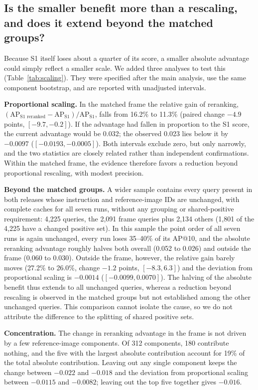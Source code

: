 \documentclass[conference]{IEEEtran}
\begin{document}
\subsection{Is the smaller benefit more than a rescaling, and does it extend beyond the matched groups?}\label{sec:res-scaling}
Because S1 itself loses about a quarter of its score, a smaller absolute advantage could simply reflect a smaller scale. We added three analyses to test this (Table~\ref{tab:scaling}). They were specified after the main analysis, use the same component bootstrap, and are reported with unadjusted intervals.

\textbf{Proportional scaling.} In the matched frame the relative gain of reranking, $(\mathrm{AP}_{\text{S1 reranked}}-\mathrm{AP}_{\text{S1}})/\mathrm{AP}_{\text{S1}}$, falls from 16.2\% to 11.3\% (paired change $-4.9$ points, $[-9.7, -0.2]$). If the advantage had fallen in proportion to the S1 score, the current advantage would be 0.032; the observed 0.023 lies below it by $-0.0097$ ($[-0.0193, -0.0005]$). Both intervals exclude zero, but only narrowly, and the two statistics are closely related rather than independent confirmations. Within the matched frame, the evidence therefore favors a reduction beyond proportional rescaling, with modest precision.

\textbf{Beyond the matched groups.} A wider sample contains every query present in both releases whose instruction and reference-image IDs are unchanged, with complete caches for all seven runs, without any grouping or shared-positive requirement: 4,225 queries, the 2,091 frame queries plus 2,134 others (1,801 of the 4,225 have a changed positive set). In this sample the point order of all seven runs is again unchanged, every run loses 35--40\% of its AP@10, and the absolute reranking advantage roughly halves both overall (0.052 to 0.026) and outside the frame (0.060 to 0.030). Outside the frame, however, the relative gain barely moves (27.2\% to 26.0\%, change $-1.2$ points, $[-8.3, 6.3]$) and the deviation from proportional scaling is $-0.0014$ ($[-0.0099, 0.0070]$). The halving of the absolute benefit thus extends to all unchanged queries, whereas a reduction beyond rescaling is observed in the matched groups but not established among the other unchanged queries. This comparison cannot isolate the cause, so we do not attribute the difference to the splitting of shared positive sets.

\textbf{Concentration.} The change in reranking advantage in the frame is not driven by a few reference-image components. Of 312 components, 180 contribute nothing, and the five with the largest absolute contribution account for 19\% of the total absolute contribution. Leaving out any single component keeps the change between $-0.022$ and $-0.018$ and the deviation from proportional scaling between $-0.0115$ and $-0.0082$; leaving out the top five together gives $-0.016$.
\end{document}
